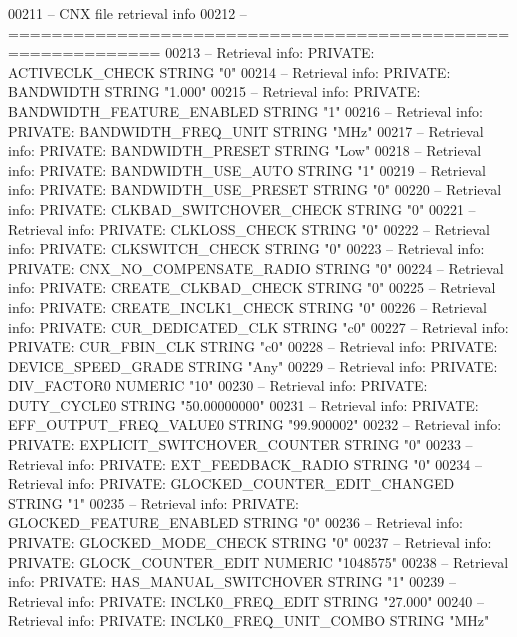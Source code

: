 \begin{DoxyCode}
{00211 \textcolor{keyword}{-- CNX file retrieval info}
00212 \textcolor{keyword}{-- ============================================================}
00213 \textcolor{keyword}{-- Retrieval info: PRIVATE: ACTIVECLK\_CHECK STRING "0"}
00214 \textcolor{keyword}{-- Retrieval info: PRIVATE: BANDWIDTH STRING "1.000"}
00215 \textcolor{keyword}{-- Retrieval info: PRIVATE: BANDWIDTH\_FEATURE\_ENABLED STRING "1"}
00216 \textcolor{keyword}{-- Retrieval info: PRIVATE: BANDWIDTH\_FREQ\_UNIT STRING "MHz"}
00217 \textcolor{keyword}{-- Retrieval info: PRIVATE: BANDWIDTH\_PRESET STRING "Low"}
00218 \textcolor{keyword}{-- Retrieval info: PRIVATE: BANDWIDTH\_USE\_AUTO STRING "1"}
00219 \textcolor{keyword}{-- Retrieval info: PRIVATE: BANDWIDTH\_USE\_PRESET STRING "0"}
00220 \textcolor{keyword}{-- Retrieval info: PRIVATE: CLKBAD\_SWITCHOVER\_CHECK STRING "0"}
00221 \textcolor{keyword}{-- Retrieval info: PRIVATE: CLKLOSS\_CHECK STRING "0"}
00222 \textcolor{keyword}{-- Retrieval info: PRIVATE: CLKSWITCH\_CHECK STRING "0"}
00223 \textcolor{keyword}{-- Retrieval info: PRIVATE: CNX\_NO\_COMPENSATE\_RADIO STRING "0"}
00224 \textcolor{keyword}{-- Retrieval info: PRIVATE: CREATE\_CLKBAD\_CHECK STRING "0"}
00225 \textcolor{keyword}{-- Retrieval info: PRIVATE: CREATE\_INCLK1\_CHECK STRING "0"}
00226 \textcolor{keyword}{-- Retrieval info: PRIVATE: CUR\_DEDICATED\_CLK STRING "c0"}
00227 \textcolor{keyword}{-- Retrieval info: PRIVATE: CUR\_FBIN\_CLK STRING "c0"}
00228 \textcolor{keyword}{-- Retrieval info: PRIVATE: DEVICE\_SPEED\_GRADE STRING "Any"}
00229 \textcolor{keyword}{-- Retrieval info: PRIVATE: DIV\_FACTOR0 NUMERIC "10"}
00230 \textcolor{keyword}{-- Retrieval info: PRIVATE: DUTY\_CYCLE0 STRING "50.00000000"}
00231 \textcolor{keyword}{-- Retrieval info: PRIVATE: EFF\_OUTPUT\_FREQ\_VALUE0 STRING "99.900002"}
00232 \textcolor{keyword}{-- Retrieval info: PRIVATE: EXPLICIT\_SWITCHOVER\_COUNTER STRING "0"}
00233 \textcolor{keyword}{-- Retrieval info: PRIVATE: EXT\_FEEDBACK\_RADIO STRING "0"}
00234 \textcolor{keyword}{-- Retrieval info: PRIVATE: GLOCKED\_COUNTER\_EDIT\_CHANGED STRING "1"}
00235 \textcolor{keyword}{-- Retrieval info: PRIVATE: GLOCKED\_FEATURE\_ENABLED STRING "0"}
00236 \textcolor{keyword}{-- Retrieval info: PRIVATE: GLOCKED\_MODE\_CHECK STRING "0"}
00237 \textcolor{keyword}{-- Retrieval info: PRIVATE: GLOCK\_COUNTER\_EDIT NUMERIC "1048575"}
00238 \textcolor{keyword}{-- Retrieval info: PRIVATE: HAS\_MANUAL\_SWITCHOVER STRING "1"}
00239 \textcolor{keyword}{-- Retrieval info: PRIVATE: INCLK0\_FREQ\_EDIT STRING "27.000"}
00240 \textcolor{keyword}{-- Retrieval info: PRIVATE: INCLK0\_FREQ\_UNIT\_COMBO STRING "MHz"}
}
\end{DoxyCode}

